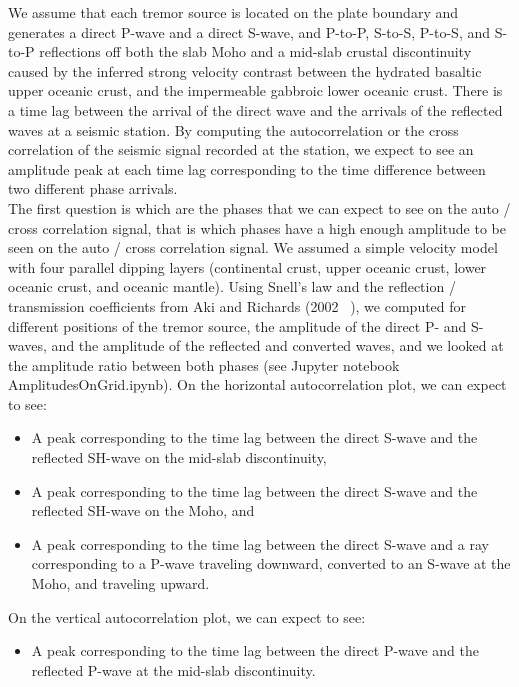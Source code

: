 \documentclass[main.tex]{subfiles}
\begin{document}
We assume that each tremor source is located on the plate boundary and generates a direct P-wave and a direct S-wave, and P-to-P, S-to-S, P-to-S, and S-to-P reflections off both the slab Moho and a mid-slab crustal discontinuity caused by the inferred strong velocity contrast between the hydrated basaltic upper oceanic crust, and the impermeable gabbroic lower oceanic crust. There is a time lag between the arrival of the direct wave and the arrivals of the reflected waves at a seismic station. By computing the autocorrelation or the cross correlation of the seismic signal recorded at the station, we expect to see an amplitude peak at each time lag corresponding to the time difference between two different phase arrivals. \\

The first question is which are the phases that we can expect to see on the auto / cross correlation signal, that is which phases have a high enough amplitude to be seen on the auto / cross correlation signal. We assumed a simple velocity model with four parallel dipping layers (continental crust, upper oceanic crust, lower oceanic crust, and oceanic mantle). Using Snell's law and the reflection / transmission coefficients from Aki and Richards (2002 ~\cite{AKI_2002}), we computed for different positions of the tremor source, the amplitude of the direct P- and S-waves, and the amplitude of the reflected and converted waves, and we looked at the amplitude ratio between both phases (see Jupyter notebook AmplitudesOnGrid.ipynb). On the horizontal autocorrelation plot, we can expect to see:

\begin{itemize}
\item A peak corresponding to the time lag between the direct S-wave and the reflected SH-wave on the mid-slab discontinuity,
\item A peak corresponding to the time lag between the direct S-wave and the reflected SH-wave on the Moho, and
\item A peak corresponding to the time lag between the direct S-wave and a ray corresponding to a P-wave traveling downward, converted to an S-wave at the Moho, and traveling upward.
\end{itemize}

On the vertical autocorrelation plot, we can expect to see:
\begin{itemize}
\item A peak corresponding to the time lag between the direct P-wave and the reflected P-wave at the mid-slab discontinuity.
\end{itemize}
\end{document}
